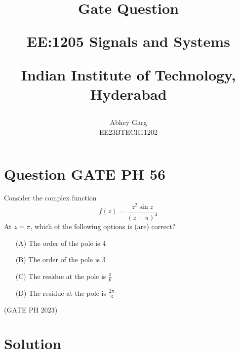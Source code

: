 \documentclass[journal,12pt,onecolumn]{IEEEtran}
\theoremstyle{remark}
\begin{document}
%




\vspace{3cm}

\title{
Gate Question

\large{EE:1205 Signals and Systems}

Indian Institute of Technology, Hyderabad
}
\author{Abhey Garg

EE23BTECH11202
}	


\maketitle



\bigskip

\renewcommand{\thefigure}{\arabic{figure}}
\renewcommand{\thetable}{\arabic{table}}
\renewcommand{\theequation}{\arabic{equation}}

\section{Question GATE PH 56}
Consider the complex function
\[ f(z) = \frac{z^{2}\sin z}{(z-\pi)^4} \]
At \( z = \pi \), which of the following options is (are) correct?
\begin{enumerate}[label=\textbf{\arabic*.}, font=\bfseries, align=left]
    \item[(A)] The order of the pole is 4 
    \item[(B)] The order of the pole is 3 
    \item[(C)] The residue at the pole is \( \frac{\pi}{6} \)
    \item[(D)] The residue at the pole is \( \frac{2\pi}{3} \)
\end{enumerate}
\hfill (GATE PH 2023)
\section{Solution}

\end{document}
